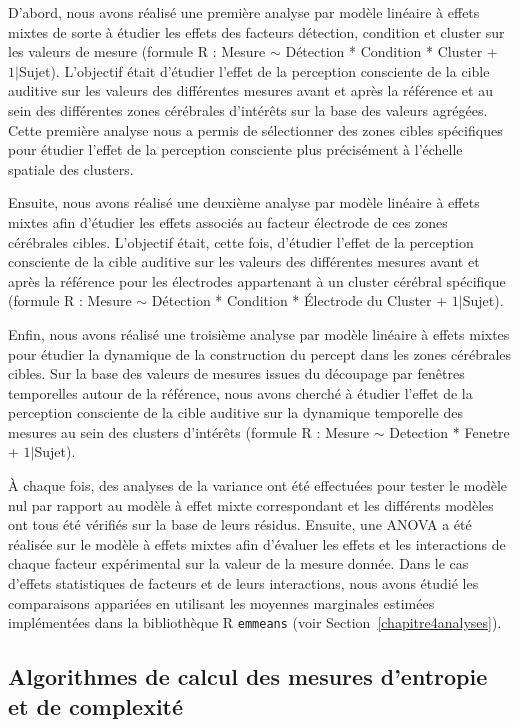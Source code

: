 D'abord, nous avons réalisé une première analyse par modèle linéaire à effets mixtes de sorte à étudier les effets des facteurs détection, condition et cluster sur les valeurs de mesure (formule R : Mesure $\sim$ Détection * Condition * Cluster + $1|$Sujet). 
L'objectif était d'étudier l'effet de la perception consciente de la cible auditive sur les valeurs des différentes mesures avant et après la référence et au sein des différentes zones cérébrales d'intérêts sur la base des valeurs agrégées. 
Cette première analyse nous a permis de sélectionner des zones cibles spécifiques pour étudier l'effet de la perception consciente plus précisément à l'échelle spatiale des clusters. 

Ensuite, nous avons réalisé une deuxième analyse par modèle linéaire à effets mixtes afin d'étudier les effets associés au facteur électrode de ces zones cérébrales cibles. 
L'objectif était, cette fois, d'étudier l'effet de la perception consciente de la cible auditive sur les valeurs des différentes mesures avant et après la référence pour les électrodes appartenant à un cluster cérébral spécifique (formule R : Mesure $\sim$ Détection * Condition * Électrode du Cluster + $1|$Sujet).

Enfin, nous avons réalisé une troisième analyse par modèle linéaire à effets mixtes pour étudier la dynamique de la construction du percept dans les zones cérébrales cibles. 
Sur la base des valeurs de mesures issues du découpage par fenêtres temporelles autour de la référence, nous avons cherché à étudier l'effet de la perception consciente de la cible auditive sur la dynamique temporelle des mesures au sein des clusters d'intérêts (formule R : Mesure $\sim$ Detection * Fenetre + $1|$Sujet). 

À chaque fois, des analyses de la variance ont été effectuées pour tester le modèle nul par rapport au modèle à effet mixte correspondant et les différents modèles ont tous été vérifiés sur la base de leurs résidus. 
Ensuite, une ANOVA a été réalisée sur le modèle à effets mixtes afin d'évaluer les effets et les interactions de chaque facteur expérimental sur la valeur de la mesure donnée. 
Dans le cas d'effets statistiques de facteurs et de leurs interactions, nous avons étudié les comparaisons appariées en utilisant les moyennes marginales estimées implémentées dans la bibliothèque R \texttt{emmeans} (voir Section~\ref{chapitre4analyses}).

\newpage
\subsection{Algorithmes de calcul des mesures d'entropie et de complexité}
\label{algorithmescalculmesures}

